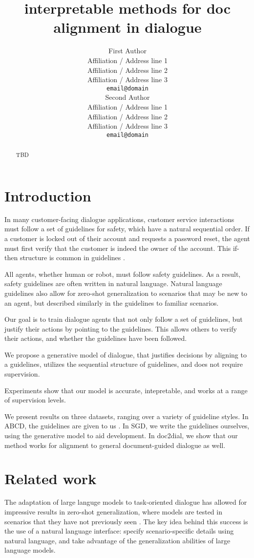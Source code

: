 \documentclass[11pt]{article}
\title{interpretable methods for doc alignment in dialogue}
\author{First Author \\
  Affiliation / Address line 1 \\
  Affiliation / Address line 2 \\
  Affiliation / Address line 3 \\
  \texttt{email@domain} \\\And
  Second Author \\
  Affiliation / Address line 1 \\
  Affiliation / Address line 2 \\
  Affiliation / Address line 3 \\
  \texttt{email@domain} \\}
\begin{document}
\maketitle
\begin{abstract}
TBD
\end{abstract}

\section{Introduction}
In many customer-facing dialogue applications,
customer service interactions must follow a set of guidelines for safety,
which have a natural sequential order.
If a customer is locked out of their account and requests a password reset,
the agent must first verify that the customer is indeed the owner of the account.
This if-then structure is common in guidelines \cite{abcd}.

All agents, whether human or robot, must follow safety guidelines.
As a result, safety guidelines are often written in natural language.
Natural language guidelines also allow for zero-shot generalization to scenarios
that may be new to an agent, but described similarly in the guidelines to
familiar scenarios.

Our goal is to train dialogue agents that not only follow a set of guidelines,
but justify their actions by pointing to the guidelines.
This allows others to verify their actions, and whether the guidelines have been followed.

We propose a generative model of dialogue,
that justifies decisions by aligning to a guidelines,
utilizes the sequential structure of guidelines,
and does not require supervision.

Experiments show that our model is accurate,
intepretable,
and works at a range of supervision levels.

We present results on three datasets, ranging over a variety of guideline styles.
In ABCD, the guidelines are given to us \citet{abcd}.
In SGD, we write the guidelines ourselves,
using the generative model to aid development.
In doc2dial, we show that our method works for alignment to general document-guided
dialogue as well.

\section{Related work}
The adaptation of large languge models to task-oriented dialogue
has allowed for impressive results in zero-shot generalization,
where models are tested in scenarios that they have not previously seen
\cite{}.
The key idea behind this success is the use of a natural language interface:
specify scenario-specific details using natural language,
and take advantage of the generalization abilities of large language models.
\end{document}
